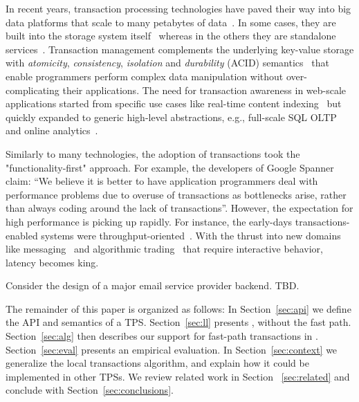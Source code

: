 In recent years, transaction processing technologies have paved their way into big data 
platforms that scale to many petabytes of data~\cite{Spanner2012,Percolator2010,Omid2017}. 
In some cases, they are built into the storage system itself~\cite{Spanner2012} whereas in the 
others they are standalone services~\cite{Omid2017}. Transaction management complements 
the underlying key-value storage with {\em atomicity}, {\em consistency}, {\em isolation\/} and 
{\em durability} (ACID) semantics~\cite{Gray:1992:TPC:573304} that enable programmers perform 
complex data manipulation without over-complicating their applications. The need for transaction awareness 
in web-scale applications started from specific use cases like real-time content indexing~\cite{Percolator2010,Omid2017} 
but quickly expanded to generic high-level abstractions, e.g., full-scale SQL OLTP and 
online analytics~\cite{Phoenix, F1-2013}.

Similarly to many technologies, the adoption of transactions took the "functionality-first" approach. 
For example, the developers of Google Spanner~\cite{Spanner2012} claim: ``We believe it
is better to have application programmers deal with performance problems due to overuse 
of transactions as bottlenecks arise, rather than always coding around the lack of transactions''. 
However, the expectation for high performance is picking up rapidly. For instance, the early-days  
transactions-enabled systems were throughput-oriented~\cite{Percolator2010,Omid2017}. 
With the thrust into new domains like messaging~\cite{Borthakur:2011} and algorithmic 
trading~\cite{opentsdb} that require interactive behavior, latency becomes king. 

Consider the design of a major email service provider backend. TBD. 

The remainder of this paper is organized as follows:
In Section~\ref{sec:api} we define the  API and semantics of a TPS. 
Section~\ref{sec:ll} presents \sys, without the fast path. 
Section~\ref{sec:alg} then describes our support for fast-path  transactions in \sys.  
Section~\ref{sec:eval} presents an empirical evaluation.
In Section~\ref{sec:context} we generalize the local transactions algorithm, and explain how it could be implemented in 
other TPSs. 
 We review related work in Section ~\ref{sec:related} and conclude with Section~\ref{sec:conclusions}.
